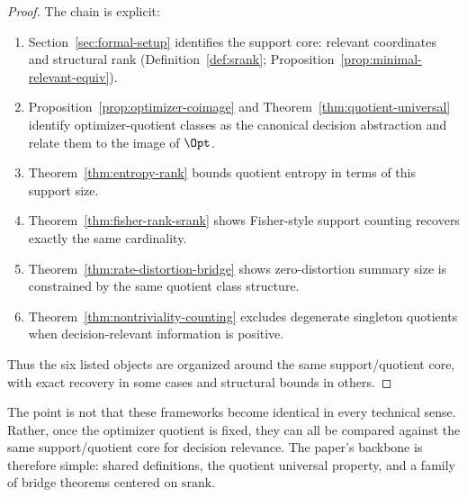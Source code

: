 \begin{proof}
The chain is explicit:
\begin{enumerate}
\item Section~\ref{sec:formal-setup} identifies the support core: relevant coordinates and structural rank (Definition~\ref{def:srank}; Proposition~\ref{prop:minimal-relevant-equiv}).
\item Proposition~\ref{prop:optimizer-coimage} and Theorem~\ref{thm:quotient-universal} identify optimizer-quotient classes as the canonical decision abstraction and relate them to the image of $\Opt$.
\item Theorem~\ref{thm:entropy-rank} bounds quotient entropy in terms of this support size.
\item Theorem~\ref{thm:fisher-rank-srank} shows Fisher-style support counting recovers exactly the same cardinality.
\item Theorem~\ref{thm:rate-distortion-bridge} shows zero-distortion summary size is constrained by the same quotient class structure.
\item Theorem~\ref{thm:nontriviality-counting} excludes degenerate singleton quotients when decision-relevant information is positive.
\end{enumerate}
Thus the six listed objects are organized around the same support/quotient core, with exact recovery in some cases and structural bounds in others.
\end{proof}

The point is not that these frameworks become identical in every technical sense. Rather, once the optimizer quotient is fixed, they can all be compared against the same support/quotient core for decision relevance. The paper's backbone is therefore simple: shared definitions, the quotient universal property, and a family of bridge theorems centered on $\mathrm{srank}$.

